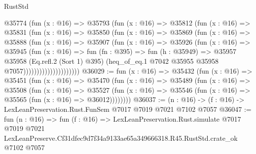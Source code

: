 \begin{lexlean}{RustStd}
\begin{coremodule}
                      @35774
                        (fun (x : @16) =>
                        @35793
                          (fun (x : @16) =>
                          @35812
                            (fun (x : @16) =>
                            @35831
                              (fun (x : @16) =>
                              @35850
                                (fun (x : @16) =>
                                @35869
                                  (fun (x : @16) =>
                                  @35888
                                    (fun (x : @16) =>
                                    @35907
                                      (fun (x : @16) =>
                                      @35926
                                        (fun (x : @16) =>
                                        @35945
                                          (fun (x : @16) =>
                                          fun (fn : @395) =>
                                          fun (h : @35949) =>
                                          @35957
                                            @35958
                                            (Eq.refl.{2} (Sort 1) @395)
                                            (heq_of_eq.{1}
                                              @7042
                                              @35955
                                              @35958
                                              @7057)))))))))))))))))))))
@36029 := fun (x : @16) =>
  @35432
    (fun (x : @16) =>
    @35451
      (fun (x : @16) =>
      @35470
        (fun (x : @16) =>
        @35489
          (fun (x : @16) =>
          @35508
            (fun (x : @16) =>
            @35527
              (fun (x : @16) => @35546 (fun (x : @16) => @35565 (fun (x : @16) => @36012))))))))
@36037 := (n : @16) -> (f : @16) -> LexLeanPreservation.Rust.FunSem @7017 @7019 @7021 @7102 @7057
@36047 := fun (n : @16) =>
  fun (f : @16) =>
  LexLeanPreservation.Rust.simulate
    @7017
    @7019
    @7021
    LexLeanPreserve.Cf31dfec9d7f34a9133ae65a349666318.R45.RustStd.crate_ok
    @7102
    @7057
\end{coremodule}
\end{lexlean}
